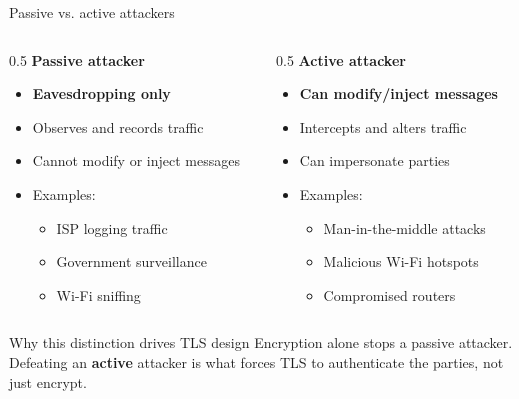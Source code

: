 \ifdefined\PRESENTATION\else\PassOptionsToClass{handout}{beamer}\fi\documentclass[aspectratio=169, lualatex]{beamer}
\begin{document}
\begin{frame}{Passive vs. active attackers}
	\begin{columns}
		\begin{column}{0.5\textwidth}
			\textbf{Passive attacker}
			\begin{itemize}[<+->]
				\item \textbf{Eavesdropping only}
				\item Observes and records traffic
				\item Cannot modify or inject messages
				\item Examples:
				      \begin{itemize}
					      \item ISP logging traffic
					      \item Government surveillance
					      \item Wi-Fi sniffing
				      \end{itemize}
			\end{itemize}
		\end{column}
		\begin{column}{0.5\textwidth}
			\textbf{Active attacker}
			\begin{itemize}[<+->]
				\item \textbf{Can modify/inject messages}
				\item Intercepts and alters traffic
				\item Can impersonate parties
				\item Examples:
				      \begin{itemize}
					      \item Man-in-the-middle attacks
					      \item Malicious Wi-Fi hotspots
					      \item Compromised routers
				      \end{itemize}
			\end{itemize}
		\end{column}
	\end{columns}
	\begin{alertblock}{Why this distinction drives TLS design}
		Encryption alone stops a passive attacker. Defeating an \textbf{active} attacker is what forces TLS to authenticate the parties, not just encrypt.
	\end{alertblock}
\end{frame}
\end{document}
